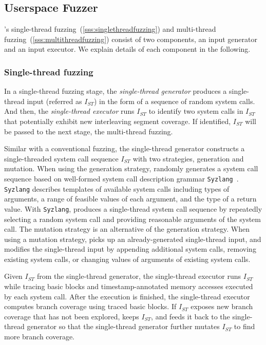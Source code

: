 \subsection{Userspace Fuzzer}
\label{ss:fuzzer}

\sys's single-thread fuzzing~(\autoref{sss:singlethreadfuzzing}) and
multi-thread fuzzing~(\autoref{sss:multithreadfuzzing}) consist of two
components, an input generator and an input executor. We explain
details of each component in the following.


\subsubsection{Single-thread fuzzing}
\label{sss:singlethreadfuzzing}
%
In a single-thread fuzzing stage, the \textit{single-thread generator}
produces a single-thread input (referred as $I_{ST}$) in the form of a
sequence of random system calls.
%
And then, the \textit{single-thread executor} runs $I_{ST}$ to
identify two system calls in $I_{ST}$ that potentially exhibit new
interleaving segment coverage.  If identified, $I_{ST}$ will be passed
to the next stage, the multi-thread fuzzing.


%
Similar with a conventional fuzzing, the single-thread generator
constructs a single-threaded system call sequence $I_{ST}$ with two
strategies, generation and mutation.
%
When using the generation strategy, \sys randomly generates a system
call sequence based on well-formed system call description grammar
\texttt{Syzlang}~\cite{syzlang}.
%
\texttt{Syzlang} describes templates of available system calls
including types of arguments, a range of feasible values of each
argument, and the type of a return value.
%
With \texttt{Syzlang}, \sys produces a single-thread system call
sequence by repeatedly selecting a random system call and providing
reasonable arguments of the system call.
%
The mutation strategy is an alternative of the generation strategy.
When using a mutation strategy, \sys picks up an already-generated
single-thread input, and modifies the single-thread input by appending
additional system calls, removing existing system calls, or changing
values of arguments of existing system calls.


%
Given $I_{ST}$ from the single-thread generator, the single-thread
executor runs $I_{ST}$ while tracing basic blocks and
timestamp-annotated memory accesses executed by each system call.
%
After the execution is finished, the single-thread executor computes
branch coverage using traced basic blocks.
%
If $I_{ST}$ exposes new branch coverage that has not been explored,
\sys keeps $I_{ST}$, and feeds it back to the single-thread generator
so that the single-thread generator further mutates $I_{ST}$ to find
more branch coverage.


